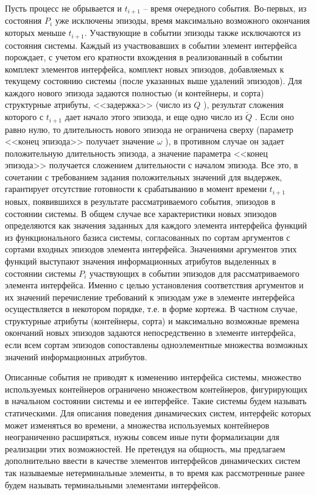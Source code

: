 Пусть процесс не обрывается и $ t_{i+1} $  – время очередного события. 
Во-первых, из состояния $ P_i $ уже исключены эпизоды, время максимально возможного окончания которых меньше $ t_{i+1} $. 
Участвующие в событии эпизоды также исключаются из состояния системы. 
Каждый из участвовавших в событии элемент интерфейса порождает, с учетом его кратности вхождения в реализованный в событии комплект элементов интерфейса, комплект новых эпизодов, добавляемых к текущему состоянию системы (после указанных выше удалений эпизодов). 
Для каждого нового эпизода задаются полностью (и контейнеры, и сорта) структурные атрибуты, <<задержка>> (число из $ Q $ ), результат сложения которого с  $ t_{i+1} $  дает начало этого эпизода, и еще одно число из $ \breve{Q} $ . 
Если оно равно нулю, то длительность нового эпизода не ограничена сверху (параметр <<конец эпизода>> получает значение $ \omega $ ), в противном случае он задает положительную длительность эпизода, а значение параметра <<конец эпизода>> получается сложением длительности с началом эпизода. 
Все это, в сочетании с требованием задания положительных значений для выдержек, гарантирует отсутствие готовности к срабатыванию в момент времени $ t_{i+1} $ новых, появившихся в результате рассматриваемого события, эпизодов в состоянии системы. 
В общем случае все характеристики новых эпизодов определяются как значения заданных для каждого элемента интерфейса функций из функционального базиса системы, согласованных по сортам аргументов с сортами входных эпизодов элемента интерфейса. 
Значениями аргументов этих функций выступают значения информационных атрибутов выделенных в состоянии системы $ P_i $ участвующих в событии эпизодов для рассматриваемого элемента интерфейса. 
Именно с целью установления соответствия аргументов и их значений перечисление требований к эпизодам уже в элементе интерфейса осуществляется в некотором порядке, т.е. в форме кортежа. 
В частном случае, структурные атрибуты (контейнеры, сорта) и максимально возможные времена окончаний новых эпизодов задаются непосредственно в элементе интерфейса, если всем сортам эпизодов сопоставлены одноэлементные множества возможных значений информационных атрибутов. 

Описанные события не приводят к изменению интерфейса системы, множество используемых контейнеров ограничено множеством контейнеров, фигурирующих в начальном состоянии системы и ее интерфейсе. 
Такие системы будем называть статическими. 
Для описания поведения динамических систем, интерфейс которых может изменяться во времени, а множества используемых контейнеров неограниченно расширяться, нужны совсем иные пути формализации для реализации этих возможностей. 
Не претендуя на общность, мы предлагаем дополнительно ввести в качестве элементов интерфейсов динамических систем так называемые нетерминальные элементы, в то время как рассмотренные ранее будем называть терминальными элементами интерфейсов. 

